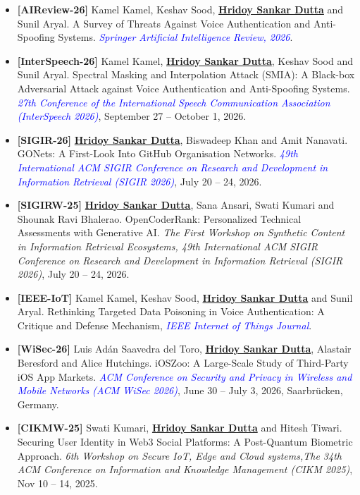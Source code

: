 \documentclass[margin, centered,lmodern]{res}
\begin{document}
\begin{resume}
\begin{itemize}[leftmargin=*]
\item \textbf{[AIReview-26]} Kamel Kamel, Keshav Sood, \textbf{\underline{Hridoy Sankar Dutta}} and Sunil Aryal.  A Survey of Threats Against Voice Authentication and Anti-Spoofing Systems.  \textit{\textcolor{blue}{Springer Artificial Intelligence Review, 2026}}.

\item \textbf{[InterSpeech-26]} Kamel Kamel, \textbf{\underline{Hridoy Sankar Dutta}},  Keshav Sood and Sunil Aryal. Spectral Masking and Interpolation Attack (SMIA): A Black-box Adversarial Attack against Voice Authentication and Anti-Spoofing Systems. \textit{\textcolor{blue}{27th Conference of the International Speech Communication Association (InterSpeech 2026)}}, September 27 – October 1, 2026. 

\item \textbf{[SIGIR-26]} \textbf{\underline{Hridoy Sankar Dutta}},  Biswadeep Khan and Amit Nanavati. GONets: A First-Look Into GitHub Organisation Networks. \textit{\textcolor{blue}{49th International ACM SIGIR Conference on Research and Development in Information Retrieval (SIGIR 2026)}}, July 20 – 24, 2026.  

\item  \textbf{[SIGIRW-25]} \textbf{\underline{Hridoy Sankar Dutta}}, Sana Ansari,  Swati Kumari and Shounak Ravi Bhalerao. OpenCoderRank: Personalized Technical Assessments with Generative AI.  \textit{The First Workshop on Synthetic Content in Information Retrieval Ecosystems,  49th International ACM SIGIR Conference on Research and Development in Information Retrieval (SIGIR 2026)}, July 20 – 24, 2026.  


\item \textbf{[IEEE-IoT]}   Kamel Kamel, Keshav Sood, \textbf{\underline{Hridoy Sankar Dutta}} and Sunil Aryal. Rethinking Targeted Data Poisoning in Voice Authentication: A Critique and Defense Mechanism, \textit{\textcolor{blue}{IEEE Internet of Things Journal}}.

\item  \textbf{[WiSec-26]} Luis Adán Saavedra del Toro,  \textbf{\underline{Hridoy Sankar Dutta}}, Alastair Beresford and Alice Hutchings. iOSZoo: A Large-Scale Study of Third-Party iOS App Markets.   \textit{\textcolor{blue}{ ACM Conference on Security and Privacy in Wireless and Mobile Networks (ACM WiSec 2026)}}, June 30 –  July 3, 2026, Saarbrücken, Germany.

\item  \textbf{[CIKMW-25]} Swati Kumari, \textbf{\underline{Hridoy Sankar Dutta}} and Hitesh Tiwari. Securing User Identity in Web3 Social Platforms: A Post-Quantum Biometric Approach.  \textit{6th Workshop on Secure IoT, Edge and Cloud systems,The 34th ACM Conference on Information and Knowledge Management (CIKM 2025)}, Nov 10 – 14, 2025.


\end{itemize}
\end{resume}
\end{document}
